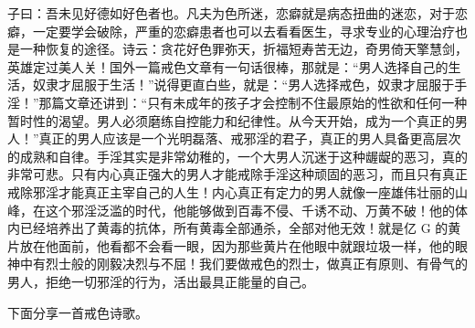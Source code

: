 子曰：吾未见好德如好色者也。凡夫为色所迷，恋癖就是病态扭曲的迷恋，对于恋癖，一定要学会破除，严重的恋癖患者也可以去看看医生，寻求专业的心理治疗也是一种恢复的途径。诗云：贪花好色罪弥天，折福短寿苦无边，奇男倚天擎慧剑，英雄定过美人关！国外一篇戒色文章有一句话很棒，那就是：“男人选择自己的生活，奴隶才屈服于生活！”说得更直白些，就是：“男人选择戒色，奴隶才屈服于手淫！”那篇文章还讲到：“只有未成年的孩子才会控制不住最原始的性欲和任何一种暂时性的渴望。男人必须磨练自控能力和纪律性。从今天开始，成为一个真正的男人！”真正的男人应该是一个光明磊落、戒邪淫的君子，真正的男人具备更高层次的成熟和自律。手淫其实是非常幼稚的，一个大男人沉迷于这种龌龊的恶习，真的非常可悲。只有内心真正强大的男人才能戒除手淫这种顽固的恶习，而且只有真正戒除邪淫才能真正主宰自己的人生！内心真正有定力的男人就像一座雄伟壮丽的山峰，在这个邪淫泛滥的时代，他能够做到百毒不侵、千诱不动、万黄不破！他的体内已经培养出了黄毒的抗体，所有黄毒全部通杀，全部对他无效！就是亿 G 的黄片放在他面前，他看都不会看一眼，因为那些黄片在他眼中就跟垃圾一样，他的眼神中有烈士般的刚毅决烈与不屈！我们要做戒色的烈士，做真正有原则、有骨气的男人，拒绝一切邪淫的行为，活出最具正能量的自己。

下面分享一首戒色诗歌。


